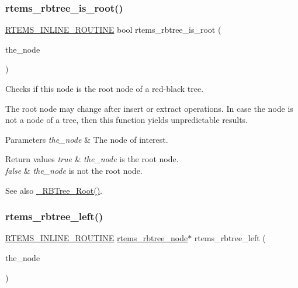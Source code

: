 \subsubsection{\texorpdfstring{rtems\_rbtree\_is\_root()}{rtems\_rbtree\_is\_root()}}
{\footnotesize\ttfamily \mbox{\hyperlink{group__RTEMSScoreBaseDefs_gac216239df231d5dbd15e3520b0b9313f}{R\+T\+E\+M\+S\+\_\+\+I\+N\+L\+I\+N\+E\+\_\+\+R\+O\+U\+T\+I\+NE}} bool rtems\+\_\+rbtree\+\_\+is\+\_\+root (\begin{DoxyParamCaption}\item[{const \mbox{\hyperlink{group__ClassicRBTrees_gaef47fc7fc61856c9afbf7f18a26ff80d}{rtems\+\_\+rbtree\+\_\+node}} $\ast$}]{the\+\_\+node }\end{DoxyParamCaption})}



Checks if this node is the root node of a red-\/black tree. 

The root node may change after insert or extract operations. In case the node is not a node of a tree, then this function yields unpredictable results.


\begin{DoxyParams}{Parameters}
{\em the\+\_\+node} & The node of interest.\\
\hline
\end{DoxyParams}

\begin{DoxyRetVals}{Return values}
{\em true} & {\itshape the\+\_\+node} is the root node. \\
\hline
{\em false} & {\itshape the\+\_\+node} is not the root node.\\
\hline
\end{DoxyRetVals}
\begin{DoxySeeAlso}{See also}
\mbox{\hyperlink{group__RTEMSScoreRBTree_ga29242f056330aaabc12dcfcaa6f10a05}{\+\_\+\+R\+B\+Tree\+\_\+\+Root()}}. 
\end{DoxySeeAlso}
\mbox{\label{group__ClassicRBTrees_gaf019459bb8dfb8ff67c0361cf1f75e0c}} 
\subsubsection{\texorpdfstring{rtems\_rbtree\_left()}{rtems\_rbtree\_left()}}
{\footnotesize\ttfamily \mbox{\hyperlink{group__RTEMSScoreBaseDefs_gac216239df231d5dbd15e3520b0b9313f}{R\+T\+E\+M\+S\+\_\+\+I\+N\+L\+I\+N\+E\+\_\+\+R\+O\+U\+T\+I\+NE}} \mbox{\hyperlink{group__ClassicRBTrees_gaef47fc7fc61856c9afbf7f18a26ff80d}{rtems\+\_\+rbtree\+\_\+node}}$\ast$ rtems\+\_\+rbtree\+\_\+left (\begin{DoxyParamCaption}\item[{const \mbox{\hyperlink{group__ClassicRBTrees_gaef47fc7fc61856c9afbf7f18a26ff80d}{rtems\+\_\+rbtree\+\_\+node}} $\ast$}]{the\+\_\+node }\end{DoxyParamCaption})}



